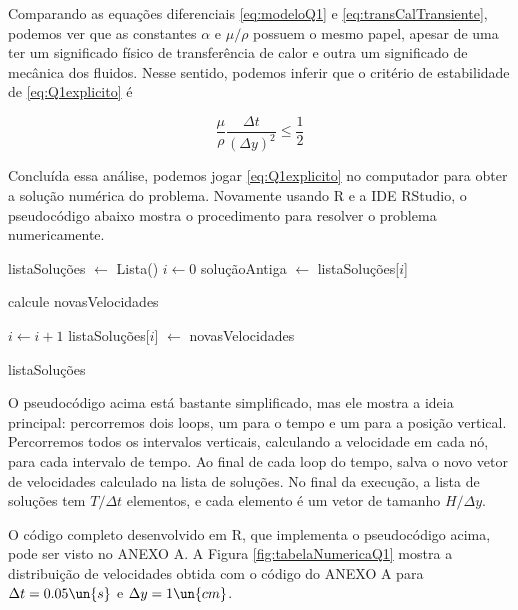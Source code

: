 Comparando as equações diferenciais \eqref{eq:modeloQ1} e \eqref{eq:transCalTransiente},
podemos ver que as constantes $\alpha$ e $\mu / \rho$ possuem o mesmo papel, apesar de uma
ter um significado físico de transferência de calor e outra um significado de mecânica dos fluidos.
Nesse sentido, podemos inferir que o critério de estabilidade de \eqref{eq:Q1explicito} é

\begin{equation}\label{eq:Q1estabilidade}
    \frac{\mu}{\rho} \frac{\Delta t}{\left(\Delta y\right)^2} \leq \frac{1}{2}
\end{equation}

Concluída essa análise, podemos jogar \eqref{eq:Q1explicito} no computador para obter a solução
numérica do problema. Novamente usando R e a IDE RStudio, o pseudocódigo abaixo mostra
o procedimento para resolver o problema numericamente.

\begin{algorithmic}
    \State listaSoluções $\gets$ Lista()
    \State $i \gets 0$
        \State soluçãoAntiga $\gets$ listaSoluções[$i$]

            \State calcule novasVelocidades
        \EndFor

        \State $i \gets i + 1$
        \State listaSoluções[$i$] $\gets$ novasVelocidades
    \EndFor

    \Return listaSoluções
\end{algorithmic}

O pseudocódigo acima está bastante simplificado, mas ele mostra a ideia principal: percorremos 
dois loops, um para o tempo e um para a posição vertical. Percorremos todos os intervalos verticais,
calculando a velocidade em cada nó, para cada intervalo de tempo. Ao final de cada loop do tempo, salva o novo
vetor de velocidades calculado na lista de soluções. No final da execução, a lista de soluções 
tem $T / \Delta t$ elementos, e cada elemento é um vetor de tamanho $H / \Delta y$.

O código completo desenvolvido em R, que implementa o pseudocódigo acima,
pode ser visto no ANEXO A. A Figura \ref*{fig:tabelaNumericaQ1} mostra a distribuição de 
velocidades obtida com o código do ANEXO A para $\Delta t = 0.05 \un{s}$ e $\Delta y = 1 \un{cm}$.

